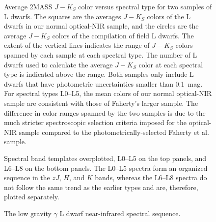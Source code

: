 \documentclass[12pt,preprint]{aastex}
\begin{document}
\begin{figure}
		\caption{Average 2MASS $J-K_S$ color versus spectral type for two samples of L dwarfs. The squares are the averages $J-K_S$ colors of the L dwarfs in our normal optical-NIR sample, and the circles are the average $J-K_S$ colors of the \citet{Faherty13_0355} compilation of field L dwarfs. The extent of the vertical lines indicates the range of $J-K_S$ colors spanned by each sample at each spectral type. The number of L dwarfs used to calculate the average $J-K_S$ color at each spectral type is indicated above the range. Both samples only include L dwarfs that have photometric uncertainties smaller than 0.1~mag. For spectral types L0--L5, the mean colors of our normal optical-NIR sample are consistent with those of Faherty's larger sample. The difference in color ranges spanned by the two samples is due to the much stricter spectroscopic selection criteria imposed for the optical-NIR sample compared to the photometrically-selected Faherty et al. sample.
}
	\label{fig:JK_colors_F13}
\end{figure}


\begin{figure}
	\caption{Spectral band templates overplotted, L0--L5 on the top panels, and L6--L8 on the bottom panels. %
	The L0--L5 spectra form an organized sequence in the $zJ$, $H$, and $K$ bands, whereas the L6--L8 spectra do not follow the same trend as the earlier types and are, therefore, plotted separately.}
	\label{fig:spec_sequence}
\end{figure}



\begin{figure}
	\caption{The low gravity $\gamma$ L dwarf near-infrared spectral sequence.}
	\label{fig:lg_sequence}
\end{figure}
\end{document}
